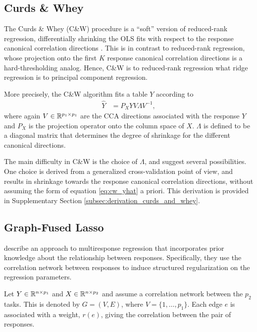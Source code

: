\documentclass[14pt]{extarticle}
\begin{document}
\subsection{Curds \& Whey}
\label{subsec:cw}

The Curds \& Whey (C\&W) procedure is a ``soft'' version of reduced-rank
regression, differentially shrinking the OLS fits with respect to the response
canonical correlation directions \citep{breiman1997predicting}. This is in
contrast to reduced-rank regression, whose projection onto the first $K$
response canonical correlation directions is a hard-thresholding analog. Hence,
C\&W is to reduced-rank regression what ridge regression is to principal
component regression.

More precisely, the C\&W algorithm fits a table $Y$ according to
\begin{align}
  \hat{Y} &= P_{X}YV\Lambda V^{-1}, \label{eq:cw_yhat}
\end{align}
where again $V \in \mathbb{R}^{p_{1} \times p_{1}}$ are the CCA directions
associated with the response $Y$ and $P_{X}$ is the projection operator onto the
column space of $X$. $\Lambda$ is defined to be a diagonal matrix that determines
the degree of shrinkage for the different canonical directions.

The main difficulty in C\&W is the choice of $\Lambda$, and
\cite{breiman1997predicting} suggest several possibilities. One choice is
derived from a generalized cross-validation point of view, and results in
shrinkage towards the response canonical correlation directions, without
assuming the form of equation \ref{eq:cw_yhat} a priori. This derivation is
provided in Supplementary Section \ref{subsec:derivation_curds_and_whey}.

\subsection{Graph-Fused Lasso}
\label{subsec:graph_fused_lasso}

\cite{chen2010graph} describe an approach to multiresponse regression that
incorporates prior knowledge about the relationship between responses.
Specifically, they use the correlation network between responses to induce
structured regularization on the regression parameters.

Let $Y \in \mathbb{R}^{n \times p_{1}}$ and $X \in \mathbb{R}^{n \times p_{2}}$ and
assume a correlation network between the $p_{2}$ tasks. This is denoted by $G =
\left(V, E\right)$, where $V = \{1, \dots, p_{1}\}$. Each edge $e$ is associated
with a weight, $r\left(e\right)$, giving the correlation between the pair of
responses.
\end{document}
